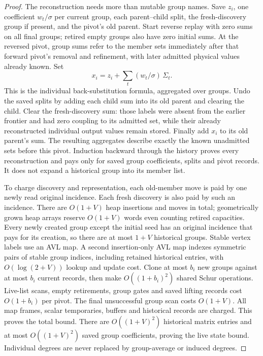 \begin{proof}
The reconstruction needs more than mutable group names. Save $z_i$, one
coefficient $w_t/\sigma$ per current group, each parent--child split, the
fresh-discovery group if present, and the pivot's old parent. Start reverse
replay with zero sums on all final groups; retired empty groups also have
zero initial sums. At the reversed pivot, group sums refer to the member
sets immediately after that forward pivot's removal and refinement, with
later admitted physical values already known. Set
\[
 x_i=z_i+\sum_t(w_t/\sigma)\,\Sigma_t.
\]
This is the individual back-substitution formula, aggregated over groups.
Undo the saved splits by adding each child sum into its old parent and
clearing the child. Clear the fresh-discovery sum: those labels were absent
from the earlier frontier and had zero coupling to its admitted set, while
their already reconstructed individual output values remain stored. Finally
add $x_i$ to its old parent's sum. The resulting aggregates describe exactly
the known unadmitted sets before this pivot. Induction backward through the
history proves every reconstruction and pays only for saved group
coefficients, splits and pivot records. It does not expand a historical
group into its member list.

To charge discovery and representation, each old-member move is paid by
one newly read original incidence. Each fresh discovery is also paid by
such an incidence. There are $O(1+V)$ heap insertions and moves in total;
geometrically grown heap arrays reserve $O(1+V)$ words even counting retired
capacities. Every newly created group except the initial seed has an
original incidence that pays for its creation, so there are at most $1+V$
historical groups. Stable vertex labels use an AVL map. A second
insertion-only AVL map indexes symmetric pairs of stable group indices,
including retained historical entries, with $O(\log(2+V))$ lookup and
update cost. Clone at most $b_i$ new groups against at most $b_i$ current
records, then make $O((1+b_i)^2)$ shared Schur operations. Live-list scans,
empty retirements, group gates and saved lifting records cost $O(1+b_i)$
per pivot. The final unsuccessful group scan costs $O(1+V)$. All map
frames, scalar temporaries, buffers and historical records are charged.
This proves the total bound. There are $O((1+V)^2)$ historical matrix
entries and at most $O((1+V)^2)$ saved group coefficients, proving the live
state bound. Individual degrees are never replaced by group-average or
induced degrees.
\end{proof}

